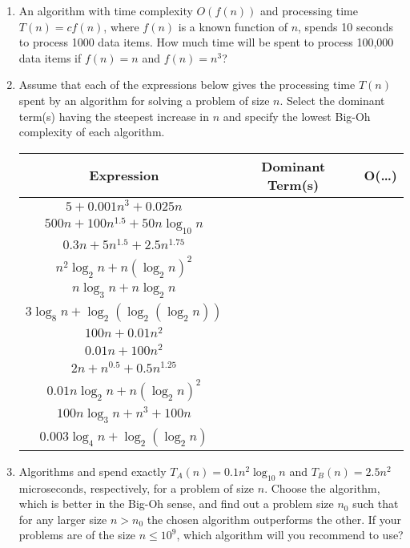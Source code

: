 \documentclass[11 pt]{article}
\begin{document}
\begin{enumerate}

    \item  An algorithm with time complexity $O(f(n))$ and processing time $T(n) = cf(n)$, where $f(n)$ is a known function of $n$, spends 10 seconds to process 1000 data items. How much time will be spent to process 100,000 data items if $f(n) = n$ and $f(n) = n^{3}$?
    
    \item Assume that each of the expressions below gives the processing time $T(n)$ spent by an algorithm for solving a problem of size $n$. Select the dominant term(s) having the steepest increase in $n$ and specify the lowest Big-Oh complexity of each algorithm.
    
    \begin{center}
        \begin{tabular}{ |c|c|c| } 
            \hline
            Expression & Dominant Term(s) & O(\dots) \\
            \hline
            $5 + 0.001n^{3} + 0.025n$ & & \\ 
            \hline
            $500n + 100n^{1.5} + 50n \log_{10} n$ & & \\ 
            \hline
            $0.3n + 5n^{1.5} + 2.5n^{1.75}$ & & \\ 
            \hline
            $n^2\log_{2} n + n(\log_{2} n)^2$ & & \\ 
            \hline
            $n \log_{3} n + n \log_{2} n$ & & \\ 
            \hline
            $3 \log_{8} n + \log_{2}(\log_{2}(\log_{2} n))$ & & \\
            \hline
            $100n + 0.01n^{2}$ & & \\
            \hline
            $0.01n + 100n^{2}$ & & \\
            \hline
            $2n + n^{0.5} + 0.5n^{1.25}$ & & \\
            \hline
            $0.01n \log_{2} n + n(\log_{2} n)^{2}$ & & \\
            \hline
            $100n \log_{3} n + n^{3} + 100n$ & & \\
            \hline
            $0.003 \log_{4} n + \log_{2}(\log_{2} n)$ & & \\
            \hline
        \end{tabular}
    \end{center}
    
    \item Algorithms  and  spend exactly $T_{A}(n) = 0.1n^{2}\log_{10} n$ and $T_{B}(n) = 2.5n^{2}$ microseconds, respectively, for a problem of size $n$. Choose the algorithm, which is better in the Big-Oh sense, and find out a problem size $n_{0}$ such that for any larger size $n > n_{0}$ the chosen algorithm outperforms the other. If your problems are of the size $n \leq 10^{9}$, which algorithm will you recommend to use?
    

\end{enumerate}
\end{document}
